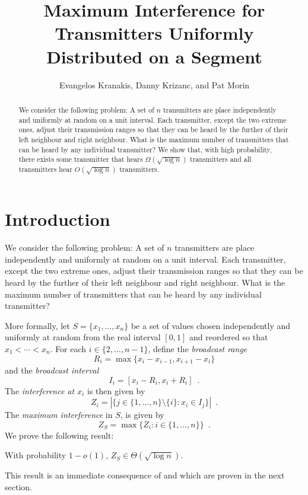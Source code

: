 \documentclass{patmorin}
\title{Maximum Interference for Transmitters Uniformly Distributed on a Segment}
\author{Evangelos Kranakis, Danny Krizanc, and Pat Morin}
\begin{document}
\maketitle

\begin{abstract}
We consider the following problem: A set of $n$ transmitters are
place independently and uniformly at random on a unit interval.  Each
transmitter, except the two extreme ones, adjust their transmission ranges
so that they can be heard by the further of their left neighbour and right
neighbour.  What is the maximum number of transmitters that can be heard
by any individual transmitter?  We show that, with high probability,
there exists some transmitter that hears $\Omega(\sqrt{\log n})$
transmitters and all transmitters hear $O(\sqrt{\log n})$ transmitters.
\end{abstract}

\section{Introduction}

We consider the following problem: A set of $n$ transmitters are
place independently and uniformly at random on a unit interval.  Each
transmitter, except the two extreme ones, adjust their transmission ranges
so that they can be heard by the further of their left neighbour and right
neighbour.  What is the maximum number of transmitters that can be heard
by any individual transmitter? 

More formally, let $S=\{x_1,\ldots,x_n\}$ be a set of values chosen
independently and uniformly at random from the real interval $[0,1]$
and reordered so that $x_1<\cdots<x_n$.  For each $i\in\{2,\ldots,n-1\}$,
define the \emph{broadcast range}
\[
   R_i = \max\{x_i - x_{i-1}, x_{i+1}-x_i\}
\]
and the \emph{broadcast interval}
\[
   I_i = [x_i-R_i,x_i+R_i] \enspace .
\]
The \emph{interference at $x_i$} is then given by
\[
   Z_i = |\{j\in\{1,\ldots,n\}\setminus\{i\} : x_i \in I_j\}| \enspace .
\]
The \emph{maximum interference} in $S$, is given by
\[
   Z_S=\max\{Z_i:i\in\{1,\ldots,n\}\} \enspace .
\]
We prove the following result:

\begin{thm}
With probability $1-o(1)$, $Z_S\in \Theta(\sqrt{\log n})$.
\end{thm}

This result is an immediate consequence of  and
 which are proven in the next section.
\end{document}
